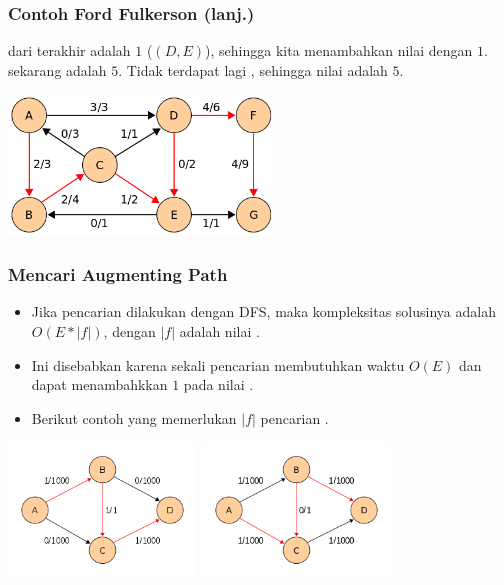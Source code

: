 \begin{frame}
\frametitle{Contoh Ford Fulkerson (lanj.)}
\fBottleneck dari \faugmentingPath terakhir adalah $1$ (\fbackEdge $(D, E)$), sehingga kita menambahkan nilai \fmaxflow dengan $1$. \fMaxflow sekarang adalah $5$.
\newline
Tidak terdapat lagi \faugmentingPath, sehingga nilai \fmaxflow adalah $5$.
\newline
\begin{center}
\includegraphics[width=7cm]{asset/ford-example-4.png}
\end{center}
\end{frame}

\begin{frame}
\frametitle{Mencari Augmenting Path}
\begin{itemize}
  \item Jika pencarian \faugmentingPath dilakukan dengan DFS, maka kompleksitas solusinya adalah $O(E * |f|)$, dengan $|f|$ adalah nilai \fmaxflow.
  \item Ini disebabkan karena sekali pencarian \faugmentingPath membutuhkan waktu $O(E)$ dan dapat menambahkkan $1$ pada nilai \fmaxflow.
  \item Berikut contoh \fgraph yang memerlukan $|f|$ pencarian \faugmentingPath.
\end{itemize}
\begin{center}
\includegraphics[width=5cm]{asset/ford-blowup-1.png}
\includegraphics[width=5cm]{asset/ford-blowup-2.png}
\end{center}
\end{frame}

